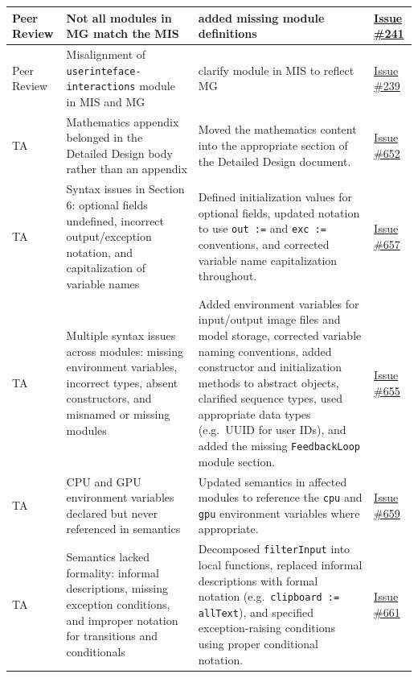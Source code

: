 \documentclass{article}
\begin{document}
\begin{longtable}{|p{2cm}|p{3.5cm}|p{4.5cm}|p{3cm}|}
Peer Review & Not all modules in MG match the MIS & added missing module definitions & \href{https://github.com/4G06-CAPSTONE-2025/Reading4All/issues/241}{Issue \#241} \\
\hline
Peer Review & Misalignment of \texttt{userinteface-} \texttt{interactions} module in MIS and MG & clarify module in MIS to reflect MG  & \href{https://github.com/4G06-CAPSTONE-2025/Reading4All/issues/239}{Issue \#239} \\
\hline
TA & Mathematics appendix belonged in the Detailed Design body rather than an appendix & Moved the mathematics content into the appropriate section of the Detailed Design document. & \href{https://github.com/4G06-CAPSTONE-2025/Reading4All/issues/652}{Issue \#652} \\ \hline
TA & Syntax issues in Section 6: optional fields undefined, incorrect output/exception notation, and capitalization of variable names & Defined initialization values for optional fields, updated notation to use \texttt{out :=} and \texttt{exc :=} conventions, and corrected variable name capitalization throughout. & \href{https://github.com/4G06-CAPSTONE-2025/Reading4All/issues/657}{Issue \#657} \\ \hline
TA & Multiple syntax issues across modules: missing environment variables, incorrect types, absent constructors, and misnamed or missing modules & Added environment variables for input/output image files and model storage, corrected variable naming conventions, added constructor and initialization methods to abstract objects, clarified sequence types, used appropriate data types (e.g.\ UUID for user IDs), and added the missing \texttt{FeedbackLoop} module section. & \href{https://github.com/4G06-CAPSTONE-2025/Reading4All/issues/655}{Issue \#655} \\ \hline
TA & CPU and GPU environment variables declared but never referenced in semantics & Updated semantics in affected modules to reference the \texttt{cpu} and \texttt{gpu} environment variables where appropriate. & \href{https://github.com/4G06-CAPSTONE-2025/Reading4All/issues/659}{Issue \#659} \\ \hline
TA & Semantics lacked formality: informal descriptions, missing exception conditions, and improper notation for transitions and conditionals & Decomposed \texttt{filterInput} into local functions, replaced informal descriptions with formal notation (e.g.\ \texttt{clipboard := allText}), and specified exception-raising conditions using proper conditional notation. & \href{https://github.com/4G06-CAPSTONE-2025/Reading4All/issues/661}{Issue \#661} \\ \hline
\end{longtable}
\end{document}
